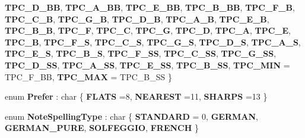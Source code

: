 \begin{DoxyCompactItemize}
\newline
{\bfseries T\+P\+C\+\_\+\+D\+\_\+\+BB}, 
{\bfseries T\+P\+C\+\_\+\+A\+\_\+\+BB}, 
{\bfseries T\+P\+C\+\_\+\+E\+\_\+\+BB}, 
{\bfseries T\+P\+C\+\_\+\+B\+\_\+\+BB}, 
\newline
{\bfseries T\+P\+C\+\_\+\+F\+\_\+B}, 
{\bfseries T\+P\+C\+\_\+\+C\+\_\+B}, 
{\bfseries T\+P\+C\+\_\+\+G\+\_\+B}, 
{\bfseries T\+P\+C\+\_\+\+D\+\_\+B}, 
\newline
{\bfseries T\+P\+C\+\_\+\+A\+\_\+B}, 
{\bfseries T\+P\+C\+\_\+\+E\+\_\+B}, 
{\bfseries T\+P\+C\+\_\+\+B\+\_\+B}, 
{\bfseries T\+P\+C\+\_\+F}, 
\newline
{\bfseries T\+P\+C\+\_\+C}, 
{\bfseries T\+P\+C\+\_\+G}, 
{\bfseries T\+P\+C\+\_\+D}, 
{\bfseries T\+P\+C\+\_\+A}, 
\newline
{\bfseries T\+P\+C\+\_\+E}, 
{\bfseries T\+P\+C\+\_\+B}, 
{\bfseries T\+P\+C\+\_\+\+F\+\_\+S}, 
{\bfseries T\+P\+C\+\_\+\+C\+\_\+S}, 
\newline
{\bfseries T\+P\+C\+\_\+\+G\+\_\+S}, 
{\bfseries T\+P\+C\+\_\+\+D\+\_\+S}, 
{\bfseries T\+P\+C\+\_\+\+A\+\_\+S}, 
{\bfseries T\+P\+C\+\_\+\+E\+\_\+S}, 
\newline
{\bfseries T\+P\+C\+\_\+\+B\+\_\+S}, 
{\bfseries T\+P\+C\+\_\+\+F\+\_\+\+SS}, 
{\bfseries T\+P\+C\+\_\+\+C\+\_\+\+SS}, 
{\bfseries T\+P\+C\+\_\+\+G\+\_\+\+SS}, 
\newline
{\bfseries T\+P\+C\+\_\+\+D\+\_\+\+SS}, 
{\bfseries T\+P\+C\+\_\+\+A\+\_\+\+SS}, 
{\bfseries T\+P\+C\+\_\+\+E\+\_\+\+SS}, 
{\bfseries T\+P\+C\+\_\+\+B\+\_\+\+SS}, 
\newline
{\bfseries T\+P\+C\+\_\+\+M\+IN} = T\+P\+C\+\_\+\+F\+\_\+\+BB, 
{\bfseries T\+P\+C\+\_\+\+M\+AX} = T\+P\+C\+\_\+\+B\+\_\+\+SS
 \}
\item 
\mbox{\label{namespace_ms_af9dcd9f3c45bd0cd8c320e74ef731f61}} 
enum {\bfseries Prefer} \+: char \{ {\bfseries F\+L\+A\+TS} =8, 
{\bfseries N\+E\+A\+R\+E\+ST} =11, 
{\bfseries S\+H\+A\+R\+PS} =13
 \}
\item 
\mbox{\label{namespace_ms_a836d4f1973a3c26e60b926c0744e3904}} 
enum {\bfseries Note\+Spelling\+Type} \+: char \{ \newline
{\bfseries S\+T\+A\+N\+D\+A\+RD} = 0, 
{\bfseries G\+E\+R\+M\+AN}, 
{\bfseries G\+E\+R\+M\+A\+N\+\_\+\+P\+U\+RE}, 
{\bfseries S\+O\+L\+F\+E\+G\+G\+IO}, 
\newline
{\bfseries F\+R\+E\+N\+CH}
 \}
\item 

\end{DoxyCompactItemize}

